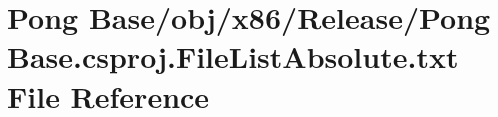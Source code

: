 \hypertarget{_release_2_pong_01_base_8csproj_8_file_list_absolute_8txt}{\section{Pong Base/obj/x86/\-Release/\-Pong Base.\-csproj.\-File\-List\-Absolute.\-txt File Reference}
\label{_release_2_pong_01_base_8csproj_8_file_list_absolute_8txt}
}
